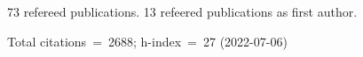 73 refereed publications. 13 refeered publications as first author.

Total citations~=~2688; h-index~=~27 (2022-07-06)